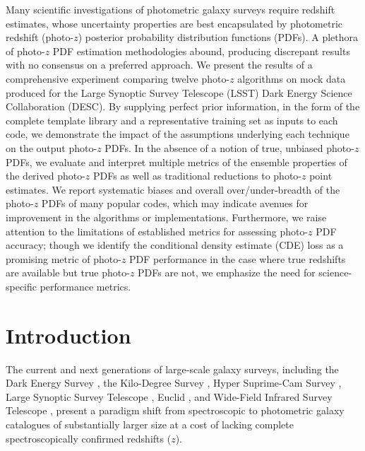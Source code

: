 Many scientific investigations of photometric galaxy surveys require redshift estimates, whose uncertainty properties are best encapsulated by photometric redshift (photo-$z$) posterior probability distribution functions (PDFs).
A plethora of photo-$z$ PDF estimation methodologies abound, producing discrepant results with no consensus on a preferred approach.
We present the results of a comprehensive experiment comparing twelve photo-$z$ algorithms on mock data produced for the Large Synoptic Survey Telescope (\textsc{LSST}) Dark Energy Science Collaboration (\textsc{DESC}).
By supplying perfect prior information, in the form of the complete template library and a representative training set as inputs to each code, we demonstrate the impact of the assumptions underlying each technique on the output photo-$z$ PDFs.
In the absence of a notion of true, unbiased photo-$z$ PDFs, we evaluate and interpret multiple metrics of the ensemble properties of the derived photo-$z$ PDFs as well as traditional reductions to photo-$z$ point estimates.
We report systematic biases and overall over/under-breadth of the photo-$z$ PDFs of many popular codes, which may indicate avenues for improvement in the algorithms or implementations.
Furthermore, we raise attention to the limitations of established metrics for assessing photo-$z$ PDF accuracy; though we identify the conditional density estimate (CDE) loss as a promising metric of photo-$z$ PDF performance in the case where true redshifts are available but true photo-$z$ PDFs are not, we emphasize the need for science-specific performance metrics.

\section{Introduction}

The current and next generations of large-scale galaxy surveys, including the Dark Energy Survey \citep[,][]{Abbott:05}, the Kilo-Degree Survey \citep[,][]{de_Jong:13}, Hyper Suprime-Cam Survey \citep[,][]{Aihara:2018a,Aihara:2018b}, Large Synoptic Survey Telescope \citep[\lsst,][]{Abell:09}, Euclid \citep{Laureijs:11}, and Wide-Field Infrared Survey Telescope \citep[,][]{Green:12}, present a paradigm shift from spectroscopic to photometric galaxy catalogues of substantially larger size at a cost of lacking complete spectroscopically confirmed redshifts ($z$).

